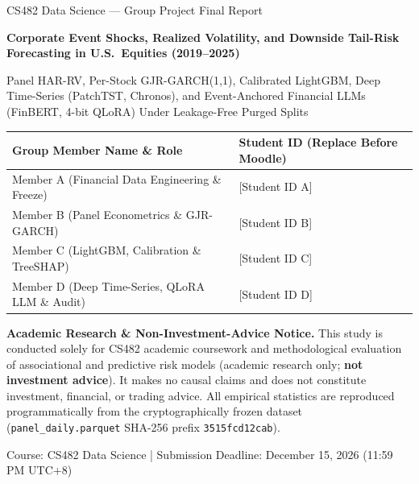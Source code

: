 \documentclass[11pt,a4paper]{article}
\begin{document}
\begin{titlepage}
\centering
\vspace*{1.1cm}
{\large CS482 Data Science --- Group Project Final Report\par}
\vspace{0.7cm}
{\LARGE\bfseries Corporate Event Shocks, Realized Volatility, and Downside
Tail-Risk Forecasting in U.S.\ Equities (2019--2025)\par}
\vspace{0.4cm}
{\large Panel HAR-RV, Per-Stock GJR-GARCH(1,1), Calibrated LightGBM, Deep Time-Series
(PatchTST, Chronos), and Event-Anchored Financial LLMs (FinBERT, 4-bit QLoRA)
Under Leakage-Free Purged Splits\par}
\vspace{1.1cm}

{\small
\begin{tabular}{ll}
\toprule
\textbf{Group Member Name \& Role} & \textbf{Student ID (Replace Before Moodle)} \\
\midrule
Member A (Financial Data Engineering \& Freeze) & [Student ID A] \\
Member B (Panel Econometrics \& GJR-GARCH) & [Student ID B] \\
Member C (LightGBM, Calibration \& TreeSHAP) & [Student ID C] \\
Member D (Deep Time-Series, QLoRA LLM \& Audit) & [Student ID D] \\
\bottomrule
\end{tabular}
}

\vspace{0.9cm}
\begin{minipage}{0.88\textwidth}
\small\raggedright
\textbf{Academic Research \& Non-Investment-Advice Notice.}
This study is conducted solely for CS482 academic coursework and methodological
evaluation of associational and predictive risk models (academic research only;
\textbf{not investment advice}). It makes no causal claims and does not
constitute investment, financial, or trading advice. All empirical statistics
are reproduced programmatically from the cryptographically frozen dataset
(\texttt{panel\_daily.parquet} SHA-256 prefix \texttt{3515fcd12cab}).
\end{minipage}

\vfill
{\normalsize Course: CS482 Data Science \quad | \quad
Submission Deadline: December 15, 2026 (11:59 PM UTC+8)\par}
\end{titlepage}
\end{document}
